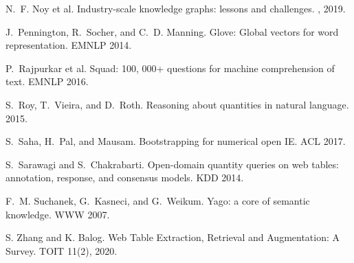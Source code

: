 \begin{thebibliography}{10}
N.~F. Noy et al.
\newblock Industry-scale knowledge graphs: lessons and challenges.
, 2019.

J.~Pennington, R.~Socher, and C.~D. Manning.
\newblock Glove: Global vectors for word representation.
\newblock EMNLP 2014.

P.~Rajpurkar et al.
\newblock Squad: 100, 000+ questions for machine comprehension of text.
\newblock EMNLP 2016.

S.~Roy, T.~Vieira, and D.~Roth.
\newblock Reasoning about quantities in natural language.
 2015.

S.~Saha, H.~Pal, and Mausam.
\newblock Bootstrapping for numerical open {IE}.
\newblock ACL 2017.

S.~Sarawagi and S.~Chakrabarti.
\newblock Open-domain quantity queries on web tables: annotation, response, and
  consensus models.
\newblock KDD 2014.

F.~M. Suchanek, G.~Kasneci, and G.~Weikum.
\newblock Yago: a core of semantic knowledge.
\newblock WWW 2007.

S. Zhang and K. Balog.
\newblock Web Table Extraction, Retrieval and Augmentation: A Survey.
\newblock TOIT 11(2), 2020.
 


\end{thebibliography}

